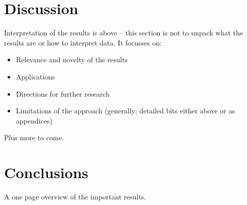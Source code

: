 \chapter{Discussion}

Interpretation of the results is above – this section is not to unpack what the results are or how to interpret data.  It focusses on:
\begin{itemize}
\item Relevance and novelty of the results
\item Applications
\item Directions for further research
\item Limitations of the approach (generally; detailed bits either above or as appendices)
\end{itemize}
Plus more to come.

\chapter{Conclusions}
A one page overview of the important results.

